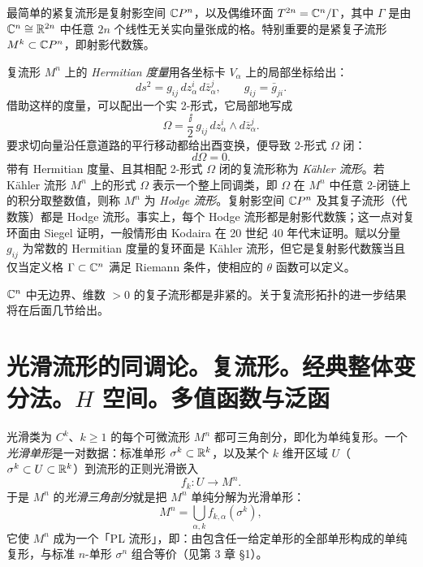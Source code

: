最简单的紧复流形是复射影空间 $\mathbb{C}P^n$，以及偶维环面 $T^{2n}=\mathbb{C}^n/\Gamma$，其中 $\Gamma$ 是由 $\mathbb{C}^n\cong\mathbb{R}^{2n}$ 中任意 $2n$ 个线性无关实向量张成的格。特别重要的是紧复子流形 $M^k\subset\mathbb{C}P^n$，即射影代数簇。

复流形 $M^n$ 上的 \emph{Hermitian 度量}用各坐标卡 $V_\alpha$ 上的局部坐标给出：
\[
  ds^2=g_{ij}\,dz_\alpha^i\,d\bar z_\alpha^j,\qquad g_{ij}=\bar g_{ji}.
\]
借助这样的度量，可以配出一个实 2-形式，它局部地写成
\[
  \Omega=\frac{\ii}{2}\,g_{ij}\,dz_\alpha^i\wedge d\bar z_\alpha^j.
\]
要求切向量沿任意道路的平行移动都给出酉变换，便导致 2-形式 $\Omega$ 闭：
\[
  d\Omega=0.
\]
带有 Hermitian 度量、且其相配 2-形式 $\Omega$ 闭的复流形称为 \emph{Kähler 流形}。若 Kähler 流形 $M^n$ 上的形式 $\Omega$ 表示一个整上同调类，即 $\Omega$ 在 $M^n$ 中任意 2-闭链上的积分取整数值，则称 $M^n$ 为 \emph{Hodge 流形}。复射影空间 $\mathbb{C}P^n$ 及其复子流形（代数簇）都是 Hodge 流形。事实上，每个 Hodge 流形都是射影代数簇；这一点对复环面由 Siegel 证明，一般情形由 Kodaira 在 20 世纪 40 年代末证明。赋以分量 $g_{ij}$ 为常数的 Hermitian 度量的复环面是 Kähler 流形，但它是复射影代数簇当且仅当定义格 $\Gamma\subset\mathbb{C}^n$ 满足 Riemann 条件，使相应的 $\theta$ 函数可以定义。

$\mathbb{C}^n$ 中无边界、维数 $>0$ 的复子流形都是非紧的。关于复流形拓扑的进一步结果将在后面几节给出。

\section[光滑流形的同调论。 复流形。 经典整体变分法。 H 空间。 多值函数与泛函]{光滑流形的同调论。复流形。经典整体变分法。$H$ 空间。多值函数与泛函}

光滑类为 $C^k$、$k\ge 1$ 的每个可微流形 $M^n$ 都可三角剖分，即化为单纯复形。一个\emph{光滑单形}是一对数据：标准单形 $\sigma^k\subset\mathbb{R}^k$，以及某个 $k$ 维开区域 $U$（$\sigma^k\subset U\subset\mathbb{R}^k$）到流形的正则光滑嵌入
\[
  f_k:U\longrightarrow M^n.
\]
于是 $M^n$ 的\emph{光滑三角剖分}就是把 $M^n$ 单纯分解为光滑单形：
\[
  M^n=\bigcup_{\alpha,k}f_{k,\alpha}(\sigma^k),
\]
它使 $M^n$ 成为一个「PL 流形」，即：由包含任一给定单形的全部单形构成的单纯复形，与标准 $n$-单形 $\sigma^n$ 组合等价（见第 3 章 §1）。

